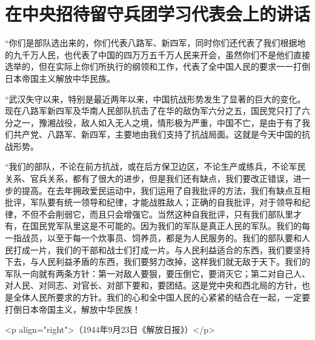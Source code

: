 \section[在中央招待留守兵团学习代表会上的讲话（一九四四年九月十八日）]{在中央招待留守兵团学习代表会上的讲话}


“你们是部队选出来的，你们代表八路军、新四军，同时你们还代表了我们根据地的九千万人民，也代表了中国的四万万五千万人民来开会，虽然你们不是他们直接选举的，但在实际上你们所执行的纲领和工作，代表了全中国人民的要求一一打倒日本帝国主义解放中华民族。

“武汉失守以来，特别是最近两年以来，中国抗战形势发生了显著的巨大的变化。现在八路军新四军及华南人民部队抗击了在华的敌伪军六分之五，国民党只打了六分之一，豫湘战役，敌人如入无人之境，情形极为严重，中国不亡，是由于有了我们共产党、八路军、新四军，主要地由我们支持了抗战局面。这就是今天中国的抗战形势。

“我们的部队，不论在前方抗战，或在后方保卫边区，不论生产或练兵，不论军民关系、官兵关系，都有了很大的进步，但是我们还有缺点，我们要改正错误，进一步的提高。在去年拥政爱民运动中，我们运用了自我批评的方法，我们有缺点互相批评，军队要有统一领导和纪律，才能战胜敌人；正确的自我批评，对于领导和纪律，不但不会削弱它，而且只会增强它。当然这种自我批评，只有我们部队里才有，在国民党军队里这是不可能的。因为我们的军队是真正人民的军队。我们的每一指战员，以至于每一个炊事员、饲养员，都是为人民服务的。我们的部队要和人民打成一片，我们的干部和战士们打成一片。与人民利益适合的东西，我们要坚持下去，与人民利益矛盾的东西，我们要努力改掉，这样我们就无敌于天下。我们的军队一向就有两条方针：第一对敌人要狠，要压倒它，要消灭它；第二对自己人、对人民、对同志、对官长、对部下要和，要团结。这是党中央和西北局的方针，也是全体人民所要求的方针。我们的心和全中国人民的心紧紧的结合在一起，一定要打倒日本帝国主义，解放中华民族！

<p align="right">（1944年9月23日《解放日报》）</p>

